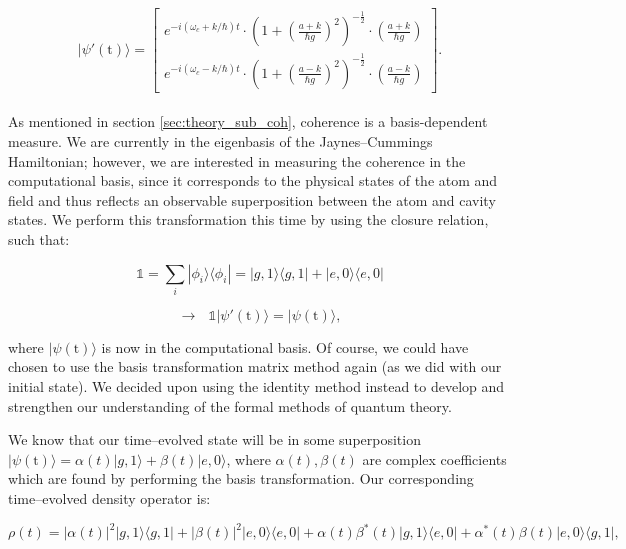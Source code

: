 \documentclass[11pt]{article}
\begin{document}
\begin{equation*}
    |\psi'(\text{t})\rangle = 
    \begin{bmatrix}
        e^{-i(\omega_c + k/\hbar)t}\cdot\left(1 + \left(\frac{a + k}{\hbar g}\right)^2\right)^{-\frac{1}{2}}\cdot\left(\frac{a + k}{\hbar g}\right) \\
        e^{-i(\omega_c - k/\hbar)t}\cdot\left(1 + \left(\frac{a - k}{\hbar g}\right)^2\right)^{-\frac{1}{2}}\cdot\left(\frac{a - k}{\hbar g}\right)
    \end{bmatrix}.
\end{equation*}
\\
As mentioned in section \ref{sec:theory_sub_coh}, coherence is a basis-dependent measure. We are currently in the eigenbasis of the Jaynes--Cummings Hamiltonian; however, we are interested in measuring the coherence in the computational basis, since it corresponds to the physical states of the atom and field and thus reflects an observable superposition between the atom and cavity states. We perform this transformation this time by using the closure relation, such that:

\begin{equation*}
    \mathds{1} = \sum_i|\phi_i\rangle\langle\phi_i| = |g,1\rangle\langle g,1| + |e,0\rangle\langle e,0|
\end{equation*}

\begin{equation*}
    \rightarrow \text{  } \mathds{1}|\psi'(\text{t})\rangle = |\psi(\text{t})\rangle,
\end{equation*}


where $|\psi(\text{t})\rangle$ is now in the computational basis. Of course, we could have chosen to use the basis transformation matrix method again (as we did with our initial state). We decided upon using the identity method instead to develop and strengthen our understanding of the formal methods of quantum theory. 

We know that our time--evolved state will be in some superposition $|\psi(\text{t})\rangle = \alpha(t)|g,1\rangle + \beta(t)|e,0\rangle$, where $\alpha(t),\beta(t)$ are complex coefficients which are found by performing the basis transformation. Our corresponding time--evolved density operator is:

\begin{equation} \label{eqn:JCM_dm(t)_closed}
    \rho(t) = |\alpha(t)|^2|g,1\rangle\langle g,1| + |\beta(t)|^2 |e,0\rangle\langle e,0| + \alpha(t)\beta^*(t)|g,1\rangle\langle e,0| + \alpha^*(t)\beta(t)|e,0\rangle\langle g,1|,
\end{equation}
\end{document}
